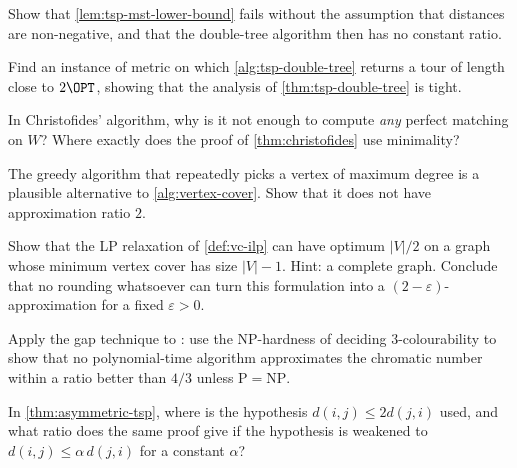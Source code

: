 \begin{exercise}
Show that \cref{lem:tsp-mst-lower-bound} fails without the assumption that
distances are non-negative, and that the double-tree algorithm then has no
constant ratio.
\end{exercise}

\begin{exercise}
Find an instance of metric  on which \cref{alg:tsp-double-tree}
returns a tour of length close to $2\OPT$, showing that the analysis of
\cref{thm:tsp-double-tree} is tight.
\end{exercise}

\begin{exercise}
In Christofides' algorithm, why is it not enough to compute \emph{any} perfect
matching on $W$? Where exactly does the proof of \cref{thm:christofides} use
minimality?
\end{exercise}

\begin{exercise}
The greedy algorithm that repeatedly picks a vertex of maximum degree is a
plausible alternative to \cref{alg:vertex-cover}. Show that it does not have
approximation ratio $2$.
\end{exercise}

\begin{exercise}
Show that the LP relaxation of \cref{def:vc-ilp} can have optimum $|V|/2$ on a
graph whose minimum vertex cover has size $|V| - 1$. Hint: a complete graph.
Conclude that no rounding whatsoever can turn this formulation into a
$(2-\varepsilon)$-approximation for a fixed $\varepsilon > 0$.
\end{exercise}

\begin{exercise}
Apply the gap technique to : use the
\textrm{NP}-hardness of deciding $3$-colourability to show that no
polynomial-time algorithm approximates the chromatic number within a ratio
better than $4/3$ unless $\mathrm{P} = \mathrm{NP}$.
\end{exercise}

\begin{exercise}
In \cref{thm:asymmetric-tsp}, where is the hypothesis $d(i,j) \le 2 d(j,i)$
used, and what ratio does the same proof give if the hypothesis is weakened to
$d(i,j) \le \alpha\, d(j,i)$ for a constant $\alpha$?
\end{exercise}
